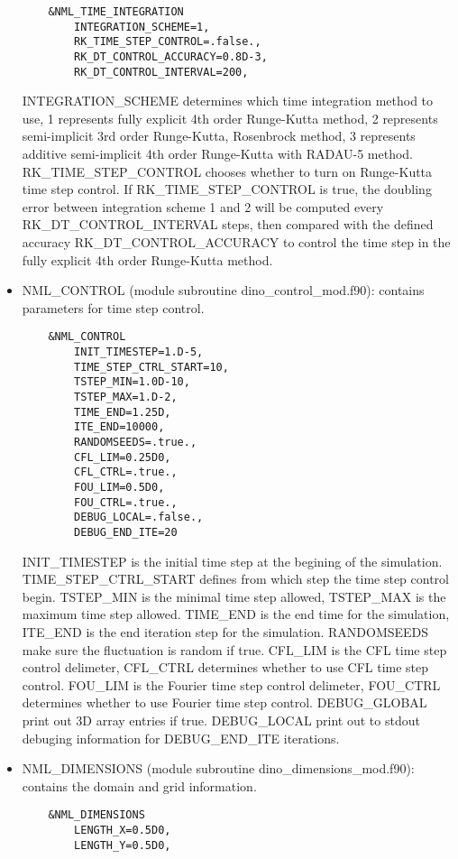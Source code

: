 \begin{itemize}
  \begin{lstlisting}
    &NML_TIME_INTEGRATION
        INTEGRATION_SCHEME=1,
        RK_TIME_STEP_CONTROL=.false.,
        RK_DT_CONTROL_ACCURACY=0.8D-3,
        RK_DT_CONTROL_INTERVAL=200,
  \end{lstlisting}
  INTEGRATION\_SCHEME determines which time integration method to use, 1 represents fully explicit 4th order Runge-Kutta method, 2 represents semi-implicit 3rd order Runge-Kutta, Rosenbrock method, 3 represents additive semi-implicit 4th order Runge-Kutta with RADAU-5 method. RK\_TIME\_STEP\_CONTROL chooses whether to turn on Runge-Kutta time step control. If RK\_TIME\_STEP\_CONTROL is true, the doubling error between integration scheme 1 and 2 will be computed every RK\_DT\_CONTROL\_INTERVAL steps, then compared with the defined accuracy RK\_DT\_CONTROL\_ACCURACY to control the time step in the fully explicit 4th order Runge-Kutta method.
  \item NML\_CONTROL (module subroutine dino\_control\_mod.f90): contains parameters for time step control.
  \begin{lstlisting}
    &NML_CONTROL
        INIT_TIMESTEP=1.D-5,
        TIME_STEP_CTRL_START=10,
        TSTEP_MIN=1.0D-10,
        TSTEP_MAX=1.D-2,
        TIME_END=1.25D,
        ITE_END=10000,
        RANDOMSEEDS=.true.,
        CFL_LIM=0.25D0,
        CFL_CTRL=.true.,
        FOU_LIM=0.5D0,
        FOU_CTRL=.true.,
        DEBUG_LOCAL=.false.,
        DEBUG_END_ITE=20
  \end{lstlisting}
  INIT\_TIMESTEP is the initial time step at the begining of the simulation. TIME\_STEP\_CTRL\_START defines from which step the time step control begin. TSTEP\_MIN is the minimal time step allowed, TSTEP\_MAX is the maximum time step allowed. TIME\_END is the end time for the simulation, ITE\_END is the end iteration step for the simulation. RANDOMSEEDS make sure the fluctuation is random if true. CFL\_LIM is the CFL time step control delimeter, CFL\_CTRL determines whether to use CFL time step control. FOU\_LIM is the Fourier time step control delimeter, FOU\_CTRL determines whether to use Fourier time step control. DEBUG\_GLOBAL print out 3D array entries if true. DEBUG\_LOCAL print out to stdout debuging information for DEBUG\_END\_ITE iterations.
  \item NML\_DIMENSIONS (module subroutine dino\_dimensions\_mod.f90): contains the domain and grid information.
  \begin{lstlisting}
    &NML_DIMENSIONS
        LENGTH_X=0.5D0,
        LENGTH_Y=0.5D0,

\end{lstlisting}
\end{itemize}
